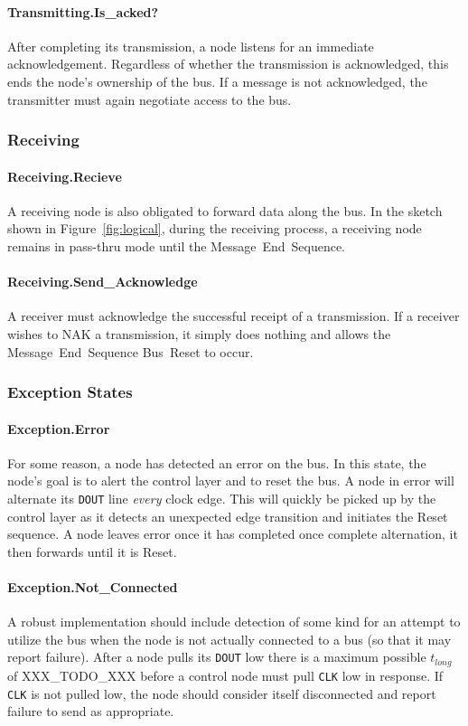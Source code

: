 \paragraph{Transmitting.{\sc Is\_acked?}}
After completing its transmission, a node listens for an immediate
acknowledgement. Regardless of whether the transmission is acknowledged, this
ends the node's ownership of the bus. If a message is not acknowledged, the
transmitter must again negotiate access to the bus.

\subsubsection{Receiving}

\paragraph{Receiving.{\sc Recieve}}
A receiving node is also obligated to forward data along the bus. In the
sketch shown in Figure~\ref{fig:logical}, during the receiving process, a
receiving node remains in pass-thru mode until the Message~End~Sequence.

\paragraph{Receiving.{\sc Send\_Acknowledge}}
A receiver must acknowledge the successful receipt of a transmission. If a
receiver wishes to NAK a transmission, it simply does nothing and allows the
Message~End~Sequence Bus~Reset to occur.

\subsubsection{Exception States}

\paragraph{Exception.{\sc Error}}
For some reason, a node has detected an error on the bus. In this state, the
node's goal is to alert the control layer and to reset the bus. A node in {\sc
error} will alternate its {\tt DOUT} line {\em every} clock edge. This will
quickly be picked up by the control layer as it detects an unexpected edge
transition and initiates the Reset sequence. A node leaves {\sc error} once it
has completed once complete alternation, it then forwards until it is Reset.

\paragraph{Exception.{\sc Not\_Connected}}
A robust implementation should include detection of some kind for an attempt
to utilize the bus when the node is not actually connected to a bus (so that
it may report failure). After a node pulls its {\tt DOUT} low there is a
maximum possible $t_{long}$ of XXX\_TODO\_XXX before a control node must pull
{\tt CLK} low in response. If {\tt CLK} is not pulled low, the node should
consider itself disconnected and report failure to send as appropriate.

